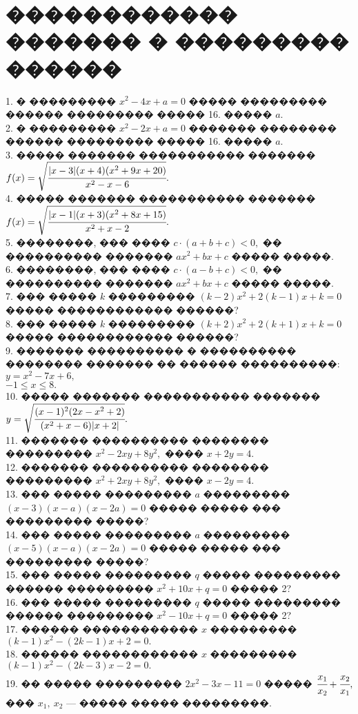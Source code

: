 \documentclass[12pt]{article}
\begin{document}
\section{������������ ������� � ��������� ������}
1. � ��������� $x^2-4x+a=0$ ����� ��������� ������ ��������� ����� 16. ����� $a.$\\
2. � ��������� $x^2-2x+a=0$ ������� �������� ������ ��������� ����� 16. ����� $a.$\\
3. ����� ������� ����������� ������� $f(x)=\sqrt{\cfrac{|x-3|(x+4)(x^2+9x+20)}{x^2-x-6}}.$\\
4. ����� ������� ����������� ������� $f(x)=\sqrt{\cfrac{|x-1|(x+3)(x^2+8x+15)}{x^2+x-2}}.$\\
5. ��������, ��� ���� $c\cdot(a+b+c)<0,$ �� ���������� ������� $ax^2+bx+c$ ����� �����.\\
6. ��������, ��� ���� $c\cdot(a-b+c)<0,$ �� ���������� ������� $ax^2+bx+c$ ����� �����.\\
7. ��� ����� $k$ ��������� $(k-2)x^2+2(k-1)x+k=0$ ����� ������������ ������?\\
8. ��� ����� $k$ ��������� $(k+2)x^2+2(k+1)x+k=0$ ����� ������������ ������?\\
9. ������� ���������� � ���������� �������� ������� �� ������ ����������: $y=x^2-7x+6,$ \\
$-1\le x\le 8.$\\
10. ����� ������� ����������� ������� $y=\sqrt{\cfrac{(x-1)^2(2x-x^2+2)}{(x^2+x-6)|x+2|}}.$\\
11. ������� ���������� �������� ��������� $x^2-2xy+8y^2,$
���� $x+2y=4.$\\
12. ������� ���������� �������� ��������� $x^2+2xy+8y^2,$
���� $x-2y=4.$\\
13. ��� ����� ��������� $a$ ��������� $(x-3)(x-a)(x-2a)=0$ ����� ����� ��� ��������� �����?\\
14. ��� ����� ��������� $a$ ��������� $(x-5)(x-a)(x-2a)=0$ ����� ����� ��� ��������� �����?\\
15. ��� ����� ��������� $q$ ����� ��������� ������ ��������� $x^2+10x+q=0$ ����� 2?\\
16. ��� ����� ��������� $q$ ����� ��������� ������ ��������� $x^2-10x+q=0$ ����� 2?\\
17. ������ ������������ $x$ ��������� $(k-1)x^2-(2k-1)x+2=0.$\\
18. ������ ������������ $x$ ��������� $(k-1)x^2-(2k-3)x-2=0.$\\
19. �� ����� ��������� $2x^2-3x-11=0$ ����� $\cfrac{x_1}{x_2}+\cfrac{x_2}{x_1},$ ��� $x_1,\ x_2$ --- ����� ����� ���������.\\
\end{document}

